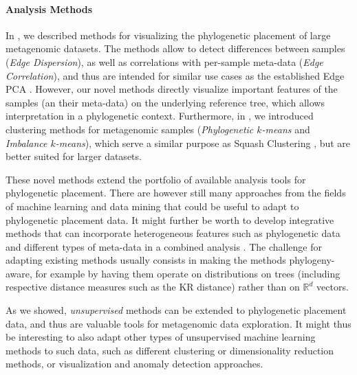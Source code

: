 \paragraph{Analysis Methods}
\label{ch:ConclusionOutlook:par:AnalysisMethods}


In , we described methods for visualizing the phylogenetic placement of large metagenomic datasets.
The methods allow to detect differences between samples (\emph{Edge Dispersion}),
as well as correlations with per-sample meta-data (\emph{Edge Correlation}),
and thus are intended for similar use cases as the established Edge PCA \citep{Matsen2011a}.
However, our novel methods directly visualize important features of the samples (an their meta-data)
on the underlying reference tree, which allows interpretation in a phylogenetic context.
Furthermore, in , we introduced clustering methods for metagenomic samples
(\emph{Phylogenetic $k$-means} and \emph{Imbalance $k$-means}),
which serve a similar purpose as Squash Clustering \citep{Matsen2011a},
but are better suited for larger datasets.

These novel methods extend the portfolio of available analysis tools for phylogenetic placement.
There are however still many approaches from the fields of machine learning and data mining
that could be useful to adapt to phylogenetic placement data.
It might further be worth to develop integrative methods that can incorporate heterogeneous features
such as phylogenetic data and different types of meta-data in a combined analysis \cite{Mariette2018}.
The challenge for adapting existing methods usually consists in making the methods phylogeny-aware,
for example by having them operate on distributions on trees
(including respective distance measures such as the KR distance) rather than on $\mathbb{R}^d$ vectors.

As we showed, \emph{unsupervised} methods can be extended to phylogenetic placement data,
and thus are valuable tools for metagenomic data exploration.
It might thus be interesting to also adapt other types of unsupervised machine learning methods to such data,
such as different clustering \cite{Kriegel2011} or dimensionality reduction \cite{VanDerMaaten2008} methods,
or visualization and anomaly detection approaches.

